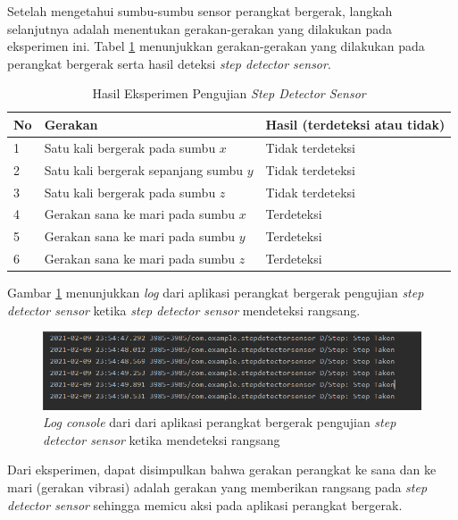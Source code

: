 Setelah mengetahui sumbu-sumbu sensor perangkat bergerak, langkah selanjutnya adalah menentukan gerakan-gerakan yang dilakukan pada eksperimen ini. Tabel \ref{tab:step-detector-test} menunjukkan gerakan-gerakan yang dilakukan pada perangkat bergerak serta hasil deteksi \textit{step detector sensor}.

\begin{table}[]
    \centering
    \caption{Hasil Eksperimen Pengujian \textit{Step Detector Sensor}}
    \begin{tabular}{|p{1cm}||p{4cm}|p{4cm}|}
    \hline
       No  & Gerakan & Hasil (terdeteksi atau tidak) \\
    \hline
        1 &  Satu kali bergerak pada sumbu $x$ & Tidak terdeteksi \\
    \hline
        2 &  Satu kali bergerak sepanjang sumbu $y$ & Tidak terdeteksi \\
    \hline
        3 &  Satu kali bergerak pada sumbu $z$ & Tidak terdeteksi\\
    \hline
    	4 &  Gerakan sana ke mari pada sumbu $x$ & Terdeteksi\\
    \hline
    	5 &  Gerakan sana ke mari pada sumbu $y$ & Terdeteksi\\
    \hline
    	6 &  Gerakan sana ke mari pada sumbu $z$ & Terdeteksi\\
    \hline
    \end{tabular}
    \label{tab:step-detector-test}
\end{table}

Gambar \ref{fig:step-detector-log} menunjukkan \textit{log} dari aplikasi perangkat bergerak pengujian \textit{step detector sensor} ketika \textit{step detector sensor} mendeteksi rangsang. 

\begin{figure}[h]
	\centering	\includegraphics[scale=1]
	{Gambar/step-detector-log.png}
	\caption{\textit{Log console} dari dari aplikasi perangkat bergerak pengujian \textit{step detector sensor} ketika mendeteksi rangsang}
	\label{fig:step-detector-log}
\end{figure}

Dari eksperimen, dapat disimpulkan bahwa gerakan perangkat ke sana dan ke mari (gerakan vibrasi) adalah gerakan yang memberikan rangsang pada \textit{step detector sensor} sehingga memicu aksi pada aplikasi perangkat bergerak.

